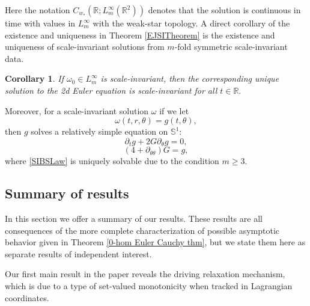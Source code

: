 \documentclass[10pt]{article}
\numberwithin{equation}{section}
\theoremstyle{plain}
\newtheorem{corollary}[lemma]{Corollary}
\theoremstyle{definition}
\numberwithin{equation}{section}
\begin{document}
Here the notation $C_{w_*}(\mathbb{R}; L_m^\infty(\mathbb{R}^2))$ denotes that the solution is continuous in time with values in $L^\infty_m$ with the weak-star topology. A direct corollary of the existence and uniqueness in Theorem \ref{EJSITheorem} is the existence and uniqueness of scale-invariant solutions from $m$-fold symmetric scale-invariant data. 
\begin{corollary}
If $\omega_0\in L^\infty_m$ is scale-invariant, then the corresponding unique solution to the 2d Euler equation is scale-invariant for all $t\in\mathbb{R}.$
\end{corollary}

\noindent Moreover, for a scale-invariant solution $\omega$ if we let $$\omega(t,r,\theta)=g(t,\theta),$$ then $g$ solves a relatively simple equation on $\mathbb{S}^1:$
\begin{equation}\label{SIEuler}\partial_t g + 2G \partial_\theta g =0,\end{equation}
\begin{equation}\label{SIBSLaw}(4+\partial_{\theta\theta})G =g,\end{equation}
where \eqref{SIBSLaw} is uniquely solvable due to the condition $m\geq 3.$

\subsection{Summary of results}
In this section we offer a summary of our results. These results are all consequences of the more complete characterization of possible asymptotic behavior given in Theorem \ref{0-hom Euler Cauchy thm}, but we state them here as separate results of independent interest.

Our first main result in the paper reveals the driving relaxation mechanism, which is due to a type of set-valued monotonicity when tracked in Lagrangian coordinates. 
\end{document}
